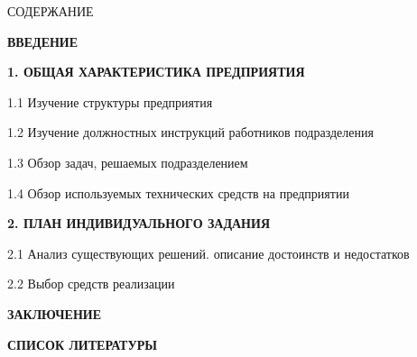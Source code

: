 {\gostTitleFont
	\redline
	СОДЕРЖАНИЕ
} 

\titlespace

{\gostFont
	\par
	\par {\bfseries ВВЕДЕНИЕ }
	\par {\bfseries 1. ОБЩАЯ ХАРАКТЕРИСТИКА ПРЕДПРИЯТИЯ }
	\par 1.1 Изучение структуры предприятия 
	\par 1.2 Изучение должностных инструкций работников подразделения 
	\par 1.3 Обзор задач, решаемых подразделением 
	\par 1.4 Обзор используемых технических средств на предприятии 
	\par {\bfseries 2. ПЛАН ИНДИВИДУАЛЬНОГО ЗАДАНИЯ }
	\par 2.1 Анализ существующих решений. описание достоинств и недостатков  
	\par 2.2 Выбор средств реализации  
	\par {\bfseries ЗАКЛЮЧЕНИЕ } 
	\par {\bfseries СПИСОК ЛИТЕРАТУРЫ } 
	\par 
}